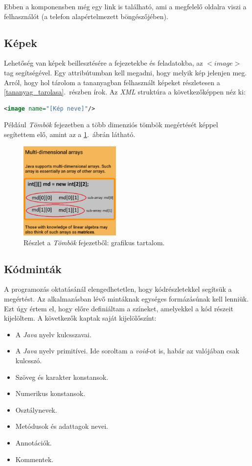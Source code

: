 \documentclass[12pt,a4paper]{article}
\newcommand{\xml}{\textit{XML}\xspace}
\begin{document}
	Ebben a komponensben még egy link is található, ami a megfelelő oldalra viszi a felhasználót (a telefon alapértelmezett böngészőjében).
	
	\subsection{Képek}
	
	Lehetőség van képek beillesztésére a fejezetekbe és feladatokba, az $<image>$ tag segítségével. Egy attribútumban kell megadni, hogy melyik kép jelenjen meg. Arról, hogy hol tárolom a tananyagban felhasznált képeket részletesen a \ref{tananyag_tarolasa}.\ részben írok. Az \xml struktúra a következőképpen néz ki:
	
	\bigskip
	\begin{lstlisting}[language=XML]
<image name="[Kép neve]"/>
	\end{lstlisting}
	
	Például \textit{Tömbök} fejezetben a több dimenziós tömbök megértését képpel segítettem elő, amint az a \ref{image_component_figure}.\ ábrán látható.
	
	\begin{figure}
		\centering
		\includegraphics[width=5cm]{image_component}
		\caption{Részlet a \textit{Tömbök} fejezetből: grafikus tartalom.}
		\label{image_component_figure}
	\end{figure}
	
	\subsection{Kódminták} \label{kodmintak}
	
	A programozás oktatásánál elengedhetetlen, hogy kódrészletekkel segítsük a megértést. Az alkalmazásban lévő mintáknak egységes formázásúnak kell lenniük. Ezt úgy értem el, hogy előre definiáltam a színeket, amelyekkel a kód részeit kijelöltem. A következők kaptak saját kijelölőszínt:
	
	\begin{itemize}
		\item A \textit{Java} nyelv kulcsszavai.
		\item A \textit{Java} nyelv primitívei. Ide soroltam a \textit{void}-ot is, habár az valójában csak kulcsszó.
		\item Szöveg és karakter konstansok.
		\item Numerikus konstansok.
		\item Osztálynevek.
		\item Metódusok és adattagok nevei.
		\item Annotációk.
		\item Kommentek. 
	\end{itemize}
	
\end{document}
